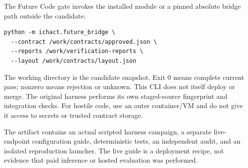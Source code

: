 The Future Code gate invokes the installed module or a pinned absolute bridge path outside the candidate:
\begin{samepage}
\begin{verbatim}
python -m ichact.future_bridge \
  --contract /work/contracts/approved.json \
  --reports /work/verification-reports \
  --layout /work/contracts/layout.json
\end{verbatim}
\end{samepage}
The working directory is the candidate snapshot. Exit 0 means complete current pass; nonzero means rejection or unknown. This CLI does not itself deploy or merge. The original harness performs its own staged-source fingerprint and integration checks. For hostile code, use an outer container/VM and do not give it access to secrets or trusted contract storage.

The artifact contains an actual scripted harness campaign, a separate live-endpoint configuration guide, deterministic tests, an independent audit, and an isolated reproduction launcher. The live guide is a deployment recipe, not evidence that paid inference or hosted evaluation was performed.

